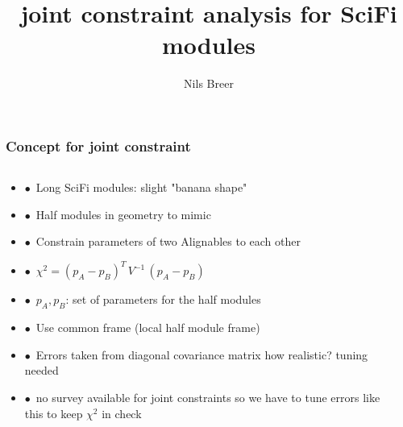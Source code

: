 \documentclass[aspectratio=1610, 12pt]{beamer}
\title{joint constraint analysis for SciFi modules}
\author[N.Breer]{Nils Breer}
\institute{AG Albrecht}
\begin{document}
\maketitle

\begin{frame}\frametitle{Concept for joint constraint}
  \begin{columns}
    \begin{column}[c]{0.58\textwidth}
      \begin{itemize}
        \item $\bullet$\, Long SciFi modules: slight "banana shape"
        \item $\bullet$\, Half modules in geometry to mimic 
        \item $\bullet$\, Constrain parameters of two Alignables to each other
        \item $\bullet$\, $\chi^2 = (p_A - p_B)^T\,V^{-1}\,(p_A - p_B)$
        \item $\bullet$\, $p_A, p_B$: set of parameters for the half modules
        \item $\bullet$\, Use common frame (local half module frame)
        \item $\bullet$\, Errors taken from diagonal covariance matrix \to how realistic? \to tuning needed
        \item $\bullet$\, no survey available for joint constraints so we have to tune errors like this to keep $\chi^2$ in check
      \end{itemize}
    \end{column}
    \begin{column}[c]{0.4\textwidth}
        
    \end{column}
  \end{columns}
\end{frame}
\end{document}
